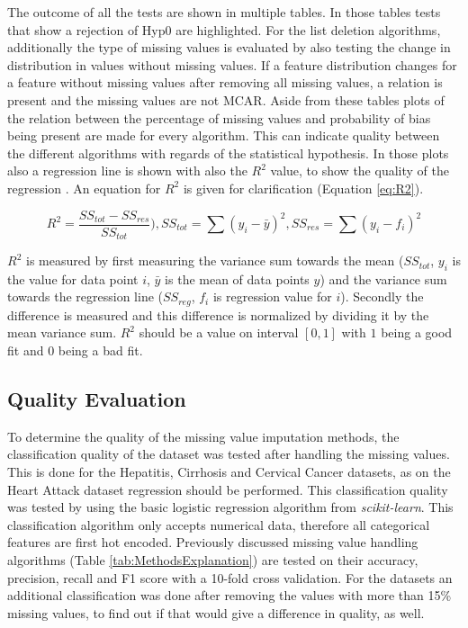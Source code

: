 \documentclass[10pt,a4paper]{report}
\begin{document}
	The outcome of all the tests are shown in multiple tables. In those tables tests that show a rejection of Hyp0 are highlighted. For the list deletion algorithms, additionally the type of missing values is evaluated by also testing the change in distribution in values without missing values. If a feature distribution changes for a feature without missing values after removing all missing values, a relation is present and the missing values are not MCAR. Aside from these tables plots of the relation between the percentage of missing values and probability of bias being present are made for every algorithm. This can indicate quality between the different algorithms with regards of the statistical hypothesis. In those plots also a regression line is shown with also the $R^2$ value, to show the quality of the regression \cite{draper2014applied}. An equation for $R^2$ is given for clarification (Equation \ref{eq:R2}). 
	
	\begin{equation}\label{eq:R2}
	R^2 = \frac{SS_{tot} - SS_{res}}{SS_{tot}}), SS_{tot} = \sum(y_i - \bar{y})^2, SS_{res} = \sum(y_i - f_i)^2 
	\end{equation} 
	
	$R^2$ is measured by first measuring the variance sum towards the mean ($SS_{tot}$, $y_i$ is the value for data point $i$, $\bar{y}$ is the mean of data points $y$) and the variance sum towards the regression line ($SS_{reg}$, $f_i$ is regression value for $i$). Secondly the difference is measured and this difference is normalized by dividing it by the mean variance sum. $R^2$ should be a value on interval $[0, 1]$ with $1$ being a good fit and $0$ being a bad fit.
	
	\subsection{Quality Evaluation}
	\label{MVsubsec:QualityEvaluation}
	
	To determine the quality of the missing value imputation methods, the classification quality of the dataset was tested after handling the missing values. This is done for the Hepatitis, Cirrhosis and Cervical Cancer datasets, as on the Heart Attack dataset regression should be performed. This classification quality was tested by using the basic logistic regression algorithm from \textit{scikit-learn}. This classification algorithm only accepts numerical data, therefore all categorical features are first hot encoded. Previously discussed missing value handling algorithms (Table \ref{tab:MethodsExplanation}) are tested on their accuracy, precision, recall and F1 score with a 10-fold cross validation. For the datasets an additional classification was done after removing the values with more than 15\% missing values, to find out if that would give a difference in quality, as well. 
	
\end{document}
